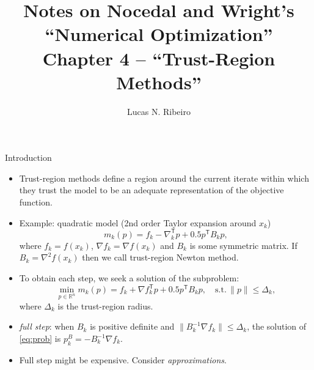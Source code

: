 \documentclass{beamer}
\title{Notes on Nocedal and Wright's ``Numerical Optimization''\\Chapter 4 --  ``Trust-Region Methods''}
\author{Lucas N. Ribeiro}
\date{}
\newcommand{\tran}{\mathsf{T}}
\newcommand{\mbb}[1]{\ensuremath{\mathbb{#1}}}
\begin{document}
 
\frame{\titlepage}
 
\begin{frame}[allowframebreaks]{Introduction}
	\begin{itemize}
		\item Trust-region methods define a region around the current iterate within which they trust the model to be an adequate representation of the objective function.
		
		\item Example: quadratic model (2nd order Taylor expansion around $x_k$)
		\begin{equation}
			m_k(p) = f_k - \nabla_k^\tran p + 0.5 p^\tran B_k p,
		\end{equation}
		where $f_k = f(x_k)$, $\nabla f_k = \nabla f(x_k)$ and $B_k$ is some symmetric matrix. If $B_k = \nabla^2f(x_k)$ then we call trust-region Newton method.
		
		\item To obtain each step, we seek a solution of the subproblem:
		\begin{equation} \label{eq:prob}
			\min_{p \in \mbb{R}^n} m_k(p) = f_k + \nabla f_k^\tran p + 0.5 p^\tran B_k p,\quad \text{s.t.}\, \|p\| \leq \Delta_k,
		\end{equation}
		where $\Delta_k$ is the trust-region radius.
		
		\item \emph{full step}: when $B_k$ is positive definite and $\|B_k^{-1}\nabla f_k\| \leq \Delta_k$, the solution of \eqref{eq:prob} is $p_k^B = -B_k^{-1} \nabla f_k$.
		
		\item Full step might be expensive. Consider \emph{approximations}.
	\end{itemize}
\end{frame} 
\end{document}
